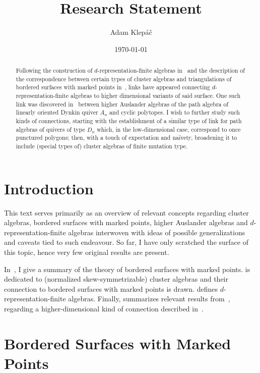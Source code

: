 \documentclass[a4paper,oneside,svgnames]{amsart}
\title{Research Statement}
\author{Adam Klepáč}
\date{\today}
\theoremstyle{plain}
\theoremstyle{definition}
\begin{document}
 \maketitle
 \begin{abstract}
  Following the construction of $d$-representation-finite algebras
  in~\cite{iyama} and the description of the correspondence between certain
  types of cluster algebras and triangulations of bordered surfaces with marked
  points in~\cite{fst}, links have appeared connecting $d$-representation-finite
  algebras to higher dimensional variants of said surface. One such link was
  discovered in~\cite{ot} between higher Auslander algebras of the path algebra
  of linearly oriented Dynkin quiver $A_n$ and cyclic polytopes. I wish to
  further study such kinds of connections, starting with the establishment of a
  similar type of link for path algebras of quivers of type $D_n$ which, in the
  low-dimensional case, correspond to once punctured polygons; then, with a
  touch of expectation and naïvety, broadening it to include (special types of)
  cluster algebras of finite mutation type.
 \end{abstract}

 \section{Introduction}
 \label{sec:introduction}

 This text serves primarily as an overview of relevant concepts regarding
 cluster algebras, bordered surfaces with marked points, higher Auslander
 algebras and $d$-representation-finite algebras interwoven with ideas of
 possible generalizations and caveats tied to such endeavour. So far, I have
 only scratched the surface of this topic, hence very few original results are
 present.

 In~, I give a summary of the
 theory of bordered surfaces with marked points.  is
 dedicated to (normalized skew-symmetrizable) cluster algebras and their
 connection to bordered surfaces with marked points is drawn.
  defines $d$-representation-finite algebras.
 Finally, 
 summarizes relevant results from~\cite{ot}, regarding a higher-dimensional kind
 of connection described in~.

 \section{Bordered Surfaces with Marked Points}
 \label{sec:bordered-surfaces-with-marked-points}
\end{document}
